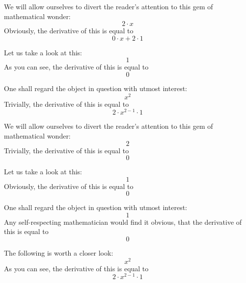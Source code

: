 \documentclass{article}
\begin{document}
We will allow ourselves to divert the reader's attention to this gem of mathematical wonder:
\begin{equation}
2 \cdot x 
\end{equation}
Obviously, the derivative of this is equal to
\begin{equation}
0 \cdot x + 2 \cdot 1 
\end{equation}

Let us take a look at this:
\begin{equation}
1 
\end{equation}
As you can see, the derivative of this is equal to
\begin{equation}
0 
\end{equation}

One shall regard the object in question with utmost interest:
\begin{equation}
x ^{2 } 
\end{equation}
Trivially, the derivative of this is equal to
\begin{equation}
2 \cdot x ^{2 - 1 } \cdot 1 
\end{equation}

We will allow ourselves to divert the reader's attention to this gem of mathematical wonder:
\begin{equation}
2 
\end{equation}
Trivially, the derivative of this is equal to
\begin{equation}
0 
\end{equation}

Let us take a look at this:
\begin{equation}
1 
\end{equation}
Obviously, the derivative of this is equal to
\begin{equation}
0 
\end{equation}

One shall regard the object in question with utmost interest:
\begin{equation}
1 
\end{equation}
Any self-respecting mathematician would find it obvious, that the derivative of this is equal to
\begin{equation}
0 
\end{equation}

The following is worth a closer look:
\begin{equation}
x ^{2 } 
\end{equation}
As you can see, the derivative of this is equal to
\begin{equation}
2 \cdot x ^{2 - 1 } \cdot 1 
\end{equation}
\end{document}
